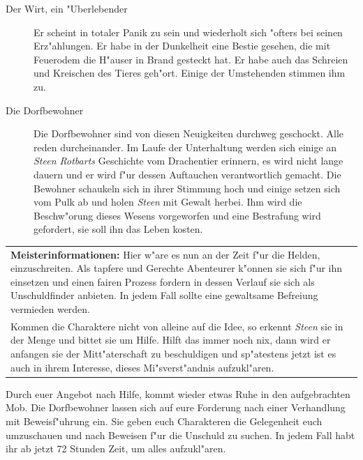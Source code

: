 \begin{description}
\item [Der Wirt, ein "Uberlebender] Er scheint in totaler Panik zu sein und wiederholt sich "ofters bei seinen Erz"ahlungen. Er habe in der Dunkelheit eine Bestie gesehen, die mit Feuerodem die H"auser in Brand gesteckt hat. Er habe auch das Schreien und Kreischen des Tieres geh"ort. Einige der Umstehenden stimmen ihm zu.
\item [Die Dorfbewohner] Die Dorfbewohner sind von diesen Neuigkeiten durchweg geschockt. Alle reden durcheinander. Im Laufe der Unterhaltung werden sich einige an \textit{Steen Rotbarts} Geschichte vom Drachentier erinnern, es wird nicht lange dauern und er wird f"ur dessen Auftauchen verantwortlich gemacht. Die Bewohner schaukeln sich in ihrer Stimmung hoch und einige setzen sich vom Pulk ab und holen \textit{Steen} mit Gewalt herbei. Ihm wird die Beschw"orung dieses Wesens vorgeworfen und eine Bestrafung wird gefordert, sie soll ihn das Leben kosten.
\end{description}

\begin{longtable}{|p{15cm}|}
\hline
\textbf{Meisterinformationen:}
Hier w"are es nun an der Zeit f"ur die Helden, einzuschreiten. Als tapfere und Gerechte Abenteurer k"onnen sie sich f"ur ihn einsetzen und einen fairen Prozess fordern in dessen Verlauf sie sich als Unschuldfinder anbieten. In jedem Fall sollte eine gewaltsame Befreiung vermieden werden.\\
Kommen die Charaktere nicht von alleine auf die Idee, so erkennt \textit{Steen} sie in der Menge und bittet sie um Hilfe. Hilft das immer noch nix, dann wird er anfangen sie der Mitt"aterschaft zu beschuldigen und sp"atestens jetzt ist es auch in ihrem Interesse, dieses Mi"sverst"andnis aufzukl"aren.\\
\hline
\end{longtable}
\par Durch euer Angebot nach Hilfe, kommt wieder etwas Ruhe in den aufgebrachten Mob. Die Dorfbewohner lassen sich auf eure Forderung nach einer Verhandlung mit Beweisf"uhrung ein. Sie geben euch Charakteren die Gelegenheit euch umzuschauen und nach Beweisen f"ur die Unschuld zu suchen. In jedem Fall habt ihr ab jetzt 72 Stunden Zeit, um alles aufzukl"aren.

